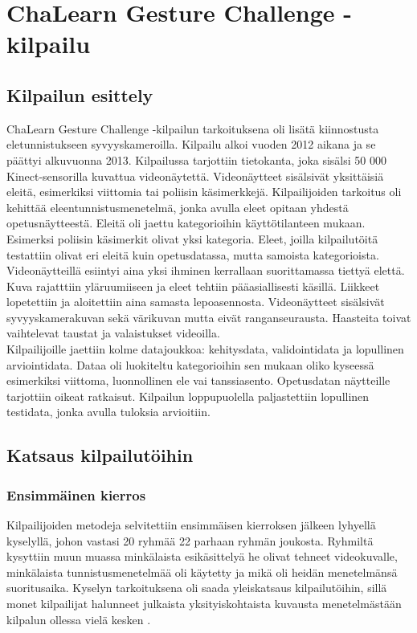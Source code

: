 \section{ChaLearn Gesture Challenge -kilpailu}
\label{ChaLearn Gesture Challenge -kilpailu}

\subsection{Kilpailun esittely}
ChaLearn Gesture Challenge -kilpailun tarkoituksena oli lisätä kiinnostusta eletunnistukseen syvyyskameroilla.
Kilpailu alkoi vuoden 2012 aikana ja se päättyi alkuvuonna 2013.
Kilpailussa tarjottiin tietokanta, joka sisälsi 50 000 Kinect-sensorilla kuvattua videonäytettä. Videonäytteet sisälsivät yksittäisiä
eleitä, esimerkiksi viittomia tai poliisin käsimerkkejä. Kilpailijoiden tarkoitus oli kehittää eleentunnistusmenetelmä, jonka avulla eleet
opitaan yhdestä opetusnäytteestä. Eleitä oli jaettu kategorioihin käyttötilanteen mukaan. Esimerksi poliisin käsimerkit olivat yksi kategoria. 
Eleet, joilla kilpailutöitä testattiin olivat eri eleitä kuin opetusdatassa, mutta samoista kategorioista.  \\

Videonäytteillä esiintyi aina yksi ihminen kerrallaan suorittamassa tiettyä elettä. Kuva rajatttiin yläruumiiseen ja eleet tehtiin
pääasiallisesti käsillä. Liikkeet lopetettiin ja aloitettiin aina samasta lepoasennosta. Videonäytteet sisälsivät syvyyskamerakuvan sekä värikuvan 
mutta eivät ranganseurausta. Haasteita toivat vaihtelevat taustat ja valaistukset videoilla. \\

Kilpailijoille jaettiin kolme datajoukkoa: kehitysdata, validointidata ja lopullinen arviointidata. Dataa oli luokiteltu kategorioihin sen mukaan
oliko kyseessä esimerkiksi viittoma, luonnollinen ele vai tanssiasento. Opetusdatan näytteille tarjottiin oikeat ratkaisut.
Kilpailun loppupuolella paljastettiin lopullinen testidata, jonka avulla tuloksia arvioitiin.
\citep {6239178} \\


\subsection{Katsaus kilpailutöihin}
\subsubsection {Ensimmäinen kierros}
Kilpailijoiden metodeja selvitettiin ensimmäisen kierroksen jälkeen lyhyellä kyselyllä, johon vastasi 20 ryhmää 22 parhaan ryhmän joukosta.
Ryhmiltä kysyttiin muun muassa minkälaista esikäsittelyä he olivat tehneet videokuvalle, minkälaista tunnistusmenetelmää oli käytetty ja
mikä oli heidän menetelmänsä suoritusaika. Kyselyn tarkoituksena oli saada yleiskatsaus kilpailutöihin, sillä monet kilpailijat
halunneet julkaista yksityiskohtaista kuvausta menetelmästään kilpalun ollessa vielä kesken \citep {6239178}. \\

